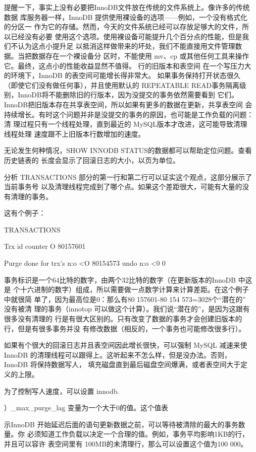 提醒一下，事实上没有必要把InnoDB文件放在传统的文件系统上。像许多的传统数据
库服务器一样，InnoDB 提供使用裸设备的选项——例如，一个没有格式化的分区一
作为它的存储。然而，今天的文件系统已经可以存放足够大的文件，所以已经没有必要
使用这个选项。使用裸设备可能提升几个百分点的性能，但是我们不认为这点小提升足
以抵消这样做带来的坏处，我们不能直接用文件管理数据。当把数据存在一个裸设备分
区时，不能使用 mv、cp 或其他任何工具来操作它。最终，这点小的性能收益显然不值得。
行的旧版本和表空间 在一个写压力大的环境下，InnoDB 的表空间可能增长得非常大。
如果事务保持打开状态很久（即使它们没有做任何事），并且使用默认的 REPEATABLE
READ事务隔离级别，InnoDB将不能删除旧的行版本，因为没提交的事务依然需要看到
它们。InnoDB把旧版本存在共享表空间，所以如果有更多的数据在更新，共享表空间
会持续增长。有时这个问题并非是没提交的事务的原因，也可能是工作负载的问题：清
理过程只有一个线程处理，直到最近的 MySQL版本才改进，这可能导致清理线程处理
速度跟不上旧版本行数增加的速度。

无论发生何种情况，SHOW INNODB STATUS的数据都可以帮助定位问题。查看历史链表的
长度会显示了回滚日志的大小，以页为单位。

分析 TRANSACTIONS 部分的第一行和第二行可以证实这个观点，这部分展示了当前事务号
以及清理线程完成到了哪个点。如果这个差距很大，可能有大量的没有清理的事务。

这有个例子：

TRANSACTIONS

Trx id counter O 80157601

Purge done for trx's n:o <O 80154573 undo n:o <0 0

事务标识是一个64比特的数字，由两个32比特的数字（在更新版本的InnoDB 中这是
个十六进制的数字）组成，所以需要做一点数学计算来计算差距。在这个例子中就很简
单了，因为最高位是0：那么有80 157601-80 154 573=3028个“潜在的” 没有被清
理的事务（innotop 可以做这个计算）。我们说“潜在的”，是因为这跟有很多没有清理的
行是有很大区别的。只有改变了数据的事务才会创建旧版本的行，但是有很多事务并没
有修改数据（相反的，一个事务也可能修改很多行）。

如果有个很大的回滚日志并且表空间因此增长很快，可以强制 MySQL 减速来使InnoDB
的清理线程可以跟得上。这听起来不怎么样，但是没办法。否则，InnoDB 将保持数据写人，
填充磁盘直到最后磁盘空间爆满，或者表空间大于定义的上限。

为了控制写人速度，可以设置 innodb.

）\_max\_purge\_lag 变量为一个大于0的值。这个值表

示InnoDB 开始延迟后面的语句更新数据之前，可以等待被清除的最大的事务数量。你
必须知道工作负载以决定一个合理的值。例如，事务平均影响1KB的行，并且可以容许
表空间里有 100MB的未清理行，那么可以设置这个值为100 000。

